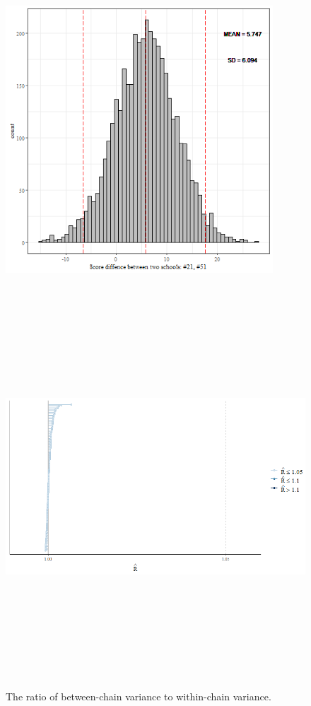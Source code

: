 \begin{figure}
	\centering
	\includegraphics[width=10cm,height=10cm,keepaspectratio]{graphics/differences.png}
	\caption{}
	\label{fig:differences}
\end{figure}

\begin{figure}
	\centering
	\includegraphics[width=15cm,height=15cm,keepaspectratio]{graphics/rhat.png}
	\caption{The ratio of between-chain variance to within-chain variance.}
	\label{fig:rhat}
\end{figure}

